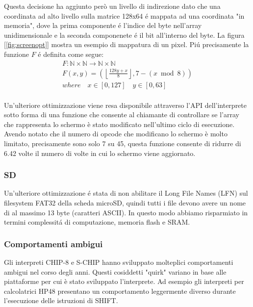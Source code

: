 \documentclass[a4paper]{article}
\begin{document}
Questa decisione ha aggiunto però un livello di indirezione dato
che una coordinata ad alto livello sulla matrice 128x64 é mappata
ad una coordinata "in memoria", dove la prima componente é l'indice
del byte nell'array unidimensionale e la seconda componenete é il bit
all'interno del byte. La figura [\ref{fig:screenopt}] mostra un esempio
di mappatura di un pixel. Piú precisamente la funzione $F$ é definita
come segue:
\begin{gather*}
    F: \mathbb{N} \times \mathbb{N} \rightarrow \mathbb{N} \times \mathbb{N} \\
    F(x, y) = \left(\left\lfloor \frac{128y + x}{8} \right\rfloor, 7 - (x \bmod 8)\right) \\
    where \quad x \in [0, 127] \quad y \in [0, 63] \\
\end{gather*}

Un'ulteriore ottimizzazione viene resa disponibile attraverso l'API
dell'interprete sotto forma di una funzione che consente al chiamante
di controllare se l'array che rappresenta lo schermo è stato
modificato nell'ultimo ciclo di esecuzione. Avendo notato che il numero di
opcode che modificano lo schermo è molto limitato, precisamente sono solo 7 su
45, questa funzione consente di ridurre di 6.42 volte il numero di volte in cui
lo schermo viene aggiornato.

\subsubsection{SD}

Un'ulteriore ottimizzazione é stata di non abilitare il
Long File Names (LFN) sul filesystem FAT32 della scheda microSD,
quindi tutti i file devono avere un nome di al massimo 13 byte
(caratteri ASCII).
In questo modo abbiamo risparmiato in termini complessitá di computazione,
memoria flash e SRAM.



\subsubsection{Comportamenti ambigui}

Gli interpreti CHIP-8 e S-CHIP hanno sviluppato molteplici
comportamenti ambigui nel corso degli anni. Questi cosiddetti
"quirk" variano in base alle piattaforme per cui è stato sviluppato
l'interprete. Ad esempio gli interpreti per calcolatrici HP48
presentano un comportamento leggermente diverso durante l'esecuzione
delle istruzioni di SHIFT.
\end{document}
